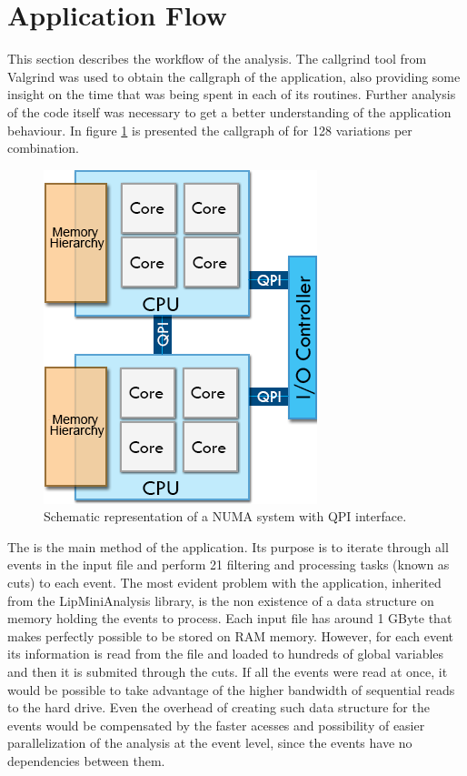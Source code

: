 \section{Application Flow}
\label{Application:Flow}

This section describes the workflow of the \tth analysis. The callgrind tool from Valgrind \cite{Callgrind} was used to obtain the callgraph of the application, also providing some insight on the time that was being spent in each of its routines. Further analysis of the code itself was necessary to get a better understanding of the application behaviour. In figure \ref{fig:CallgraphOriginal} is presented the callgraph of \tth for 128 variations per combination.

\begin{figure}[!htp]
	\begin{center}
		\includegraphics[scale=0.5]{../../common/img/numa_qpi.png}
		\caption{Schematic representation of a NUMA system with QPI interface.}
		\label{fig:CallgraphOriginal}
	\end{center}
\end{figure}

The \ttLoop is the main method of the application. Its purpose is to iterate through all events in the input file and perform 21 filtering and processing tasks (known as cuts) to each event. The most evident problem with the application, inherited from the LipMiniAnalysis library, is the non existence of a data structure on memory holding the events to process. Each input file has around 1 GByte that makes perfectly possible to be stored on RAM memory. However, for each event its information is read from the file and loaded to hundreds of global variables and then it is submited through the cuts. If all the events were read at once, it would be possible to take advantage of the higher bandwidth of sequential reads to the hard drive. Even the overhead of creating such data structure for the events would be compensated by the faster acesses and possibility of easier parallelization of the analysis at the event level, since the events have no dependencies between them.

